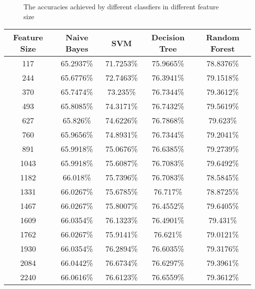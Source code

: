 \documentclass[12pt]{article}
\begin{document}
\begin{figure}
\centering
\caption{The accuracies achieved by different classfiers in different feature size}
\label{classifiers-feature-size}
\end{figure}

\begin{table}
\begin{center}
    \begin{tabular}{ | c || c | c | c | c | }
        \hline
        \textbf{Feature Size} & \textbf{Naive Bayes} & \textbf{SVM} & \textbf{Decision Tree} & \textbf{Random Forest} \\ \hline
        \hline
        117 & 65.2937\% & 71.7253\% & 75.9665\% & 78.8376\% \\ \hline
        244 & 65.6776\% & 72.7463\% & 76.3941\% & 79.1518\% \\ \hline
        370 & 65.7474\% & 73.235\% & 76.7344\% & 79.3612\% \\ \hline
        493 & 65.8085\% & 74.3171\% & 76.7432\% & 79.5619\% \\ \hline
        627 & 65.826\% & 74.6226\% & 76.7868\% & 79.623\% \\ \hline
        760 & 65.9656\% & 74.8931\% & 76.7344\% & 79.2041\% \\ \hline
        891 & 65.9918\% & 75.0676\% & 76.6385\% & 79.2739\% \\ \hline
        1043 & 65.9918\% & 75.6087\% & 76.7083\% & 79.6492\% \\ \hline
        1182 & 66.018\% & 75.7396\% & 76.7083\% & 78.5845\% \\ \hline
        1331 & 66.0267\% & 75.6785\% & 76.717\% & 78.8725\% \\ \hline
        1467 & 66.0267\% & 75.8007\% & 76.4552\% & 79.6405\% \\ \hline
        1609 & 66.0354\% & 76.1323\% & 76.4901\% & 79.431\% \\ \hline
        1762 & 66.0267\% & 75.9141\% & 76.621\% & 79.0121\% \\ \hline
        1930 & 66.0354\% & 76.2894\% & 76.6035\% & 79.3176\% \\ \hline
        2084 & 66.0442\% & 76.6734\% & 76.6297\% & 79.3961\% \\ \hline
        2240 & 66.0616\% & 76.6123\% & 76.6559\% & 79.3612\% \\ \hline

\end{tabular}
\end{center}
\end{table}
\end{document}
